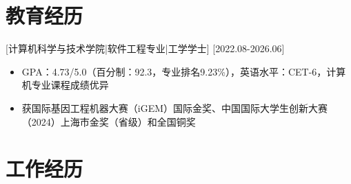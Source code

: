 \documentclass{style/template}
\begin{document}

\ResumeTitle

\section{教育经历}

[\textnormal{计算机科学与技术学院|软件工程专业|}工学学士]
[2022.08-2026.06]
\begin{itemize}
    \item GPA：4.73/5.0（百分制：92.3，专业排名9.23\%），英语水平：CET-6，计算机专业课程成绩优异
    \item 获国际基因工程机器大赛（iGEM）国际金奖、中国国际大学生创新大赛（2024）上海市金奖（省级）和全国铜奖
\end{itemize}

\section{工作经历}
\end{document}
